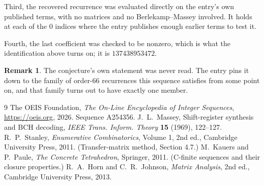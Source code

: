\documentclass[11pt,a4paper]{article}
\theoremstyle{plain}
\theoremstyle{definition}
\newtheorem{remark}[theorem]{Remark}
\begin{document}
Third, the recovered recurrence was evaluated directly on the entry's own published terms, with
no matrices and no Berlekamp--Massey involved. It holds at each of the $0$ indices where
the entry publishes enough earlier terms to test it.

Fourth, the last coefficient was checked to be nonzero, which is what the identification above
turns on; it is $137438953472$.

\begin{remark}
The conjecture's own statement was never read. The entry pins it down to the family of
order-$66$ recurrences this sequence satisfies from some point on, and that family turns
out to have exactly one member.
\end{remark}

\begin{thebibliography}{9}
 The OEIS Foundation, \emph{The On-Line Encyclopedia of Integer
Sequences}, \url{https://oeis.org}, 2026. Sequence A254356.
 J.~L.~Massey, Shift-register synthesis and BCH decoding, \emph{IEEE
Trans. Inform. Theory} \textbf{15} (1969), 122--127.
 R.~P.~Stanley, \emph{Enumerative Combinatorics}, Volume 1, 2nd ed.,
Cambridge University Press, 2011. (Transfer-matrix method, Section 4.7.)
 M.~Kauers and P.~Paule, \emph{The Concrete Tetrahedron}, Springer, 2011.
(C-finite sequences and their closure properties.)
 R.~A.~Horn and C.~R.~Johnson, \emph{Matrix Analysis}, 2nd ed., Cambridge
University Press, 2013.
\end{thebibliography}
\end{document}
